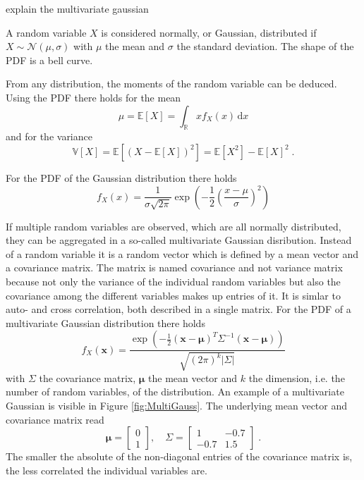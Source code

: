 \documentclass[%
  a4paper,oneside,%
  11pt,%
  smallchapters,
  green,%
  rgb, <cmyk>
  ,]{tubsbook}
\begin{document}
explain the multivariate gaussian

A random variable $X$ is considered normally, or Gaussian, distributed if $X \sim \mathcal{N}(\mu, \sigma)$ with $\mu$ the mean and $\sigma$ the standard deviation. The shape of the PDF is a bell curve.

From any distribution, the moments of the random variable can be deduced. Using the PDF there holds for the mean
\begin{equation}
\mu = \mathbb{E}[X] = \int_{\mathbb{R}} x f_X(x) \, \mathrm{d}x
\end{equation}
%
and for the variance
\begin{equation}
\mathbb{V}[X] = \mathbb{E}[(X-\mathbb{E}[X])^2] = \mathbb{E}[X^2] - \mathbb{E}[X]^2 \;.
\end{equation}

For the PDF of the Gaussian distribution there holds
\begin{equation}
f_X(x) = \frac{1}{\sigma \sqrt{2 \pi}} \exp(-\frac{1}{2} \left(\frac{x-\mu}{\sigma}\right)^2)
\end{equation}

If multiple random variables are observed, which are all normally distributed, they can be aggregated in a so-called multivariate Gaussian disribution. Instead of a random variable it is a random vector which is defined by a mean vector and a covariance matrix. The matrix is named covariance and not variance matrix because not only the variance of the individual random variables but also the covariance among the different variables makes up entries of it. It is simlar to auto- and cross correlation, both described in a single matrix.
For the PDF of a multivariate Gaussian distribution there holds
\begin{equation}
f_X(\bm{x}) = \frac{\exp(-\frac{1}{2}(\bm{x}-\bm{\mu})^T \Sigma^{-1}(\bm{x}-\bm{\mu}))}{\sqrt{(2\pi)^k \lvert \Sigma \rvert}}
\end{equation}
with $\Sigma$ the covariance matrix, $\bm{\mu}$ the mean vector and $k$ the dimension, i.e. the number of random variables, of the distribution.
An example of a multivariate Gaussian is visible in Figure \ref{fig:MultiGauss}. The underlying mean vector and covariance matrix read
\begin{equation}
\bm{\mu} = \begin{bmatrix}
           0 \\
           1
         \end{bmatrix}
, \quad     
\Sigma = \begin{bmatrix}
1 & -0.7 \\
-0.7 & 1.5 
\end{bmatrix} \;.
\end{equation}
The smaller the absolute of the non-diagonal entries of the covariance matrix is, the less correlated the individual variables are.
\end{document}
